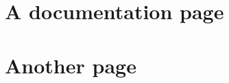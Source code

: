\section{A documentation page}
\label{page1}
\hypertarget{page1}{}

\section{Another page}
\label{page2}
\hypertarget{page2}{}

